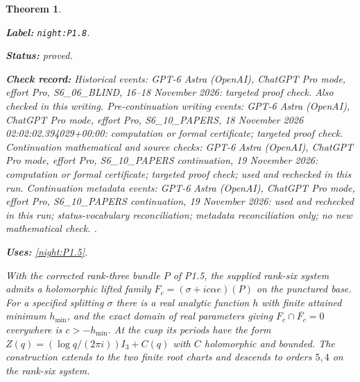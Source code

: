 \documentclass[11pt,a4paper]{article}
\newtheorem{theorem}{Theorem}[section]
\theoremstyle{definition}
\newcommand{\StatementRecord}[4]{\par\smallskip\begingroup\upshape\raggedright\noindent\textbf{Label:} \nolinkurl{#1}.\par\noindent\textbf{Status:} #2.\par\noindent\textbf{Check record:} #3.\par\noindent\textbf{Uses:} #4.\par\endgroup\smallskip}
\begin{document}
\begin{theorem}\label{night:P1.8}
\StatementRecord{night:P1.8}{proved}{Historical events: GPT-6 Astra (OpenAI), ChatGPT Pro mode, effort Pro, S6\_06\_BLIND, 16--18 November 2026: targeted proof check. Also checked in this writing. Pre-continuation writing events: GPT-6 Astra (OpenAI), ChatGPT Pro mode, effort Pro, S6\_10\_PAPERS, 18 November 2026 02:02:02.394029+00:00: computation or formal certificate; targeted proof check. Continuation mathematical and source checks: GPT-6 Astra (OpenAI), ChatGPT Pro mode, effort Pro, S6\_10\_PAPERS continuation, 19 November 2026: computation or formal certificate; targeted proof check; used and rechecked in this run. Continuation metadata events: GPT-6 Astra (OpenAI), ChatGPT Pro mode, effort Pro, S6\_10\_PAPERS continuation, 19 November 2026: used and rechecked in this run; status-vocabulary reconciliation; metadata reconciliation only; no new mathematical check. }{\cref{night:P1.5}}
With the corrected rank-three bundle $P$ of P1.5, the supplied rank-six
system admits a holomorphic lifted family
$F_c=(\sigma+ic\alpha e)(P)$ on the punctured base.
For a specified splitting $\sigma$ there is a real analytic function
$h$ with finite attained minimum $h_{\min}$, and the exact domain of
real parameters giving $F_c\cap\overline{F_c}=0$ everywhere is
$c>-h_{\min}$.
At the cusp its periods have the form
$Z(q)=(\log q/(2\pi i))I_3+C(q)$ with $C$ holomorphic and bounded.
The construction extends to the two finite root charts and descends to
orders $5,4$ on the rank-six system.
\end{theorem}
\end{document}
